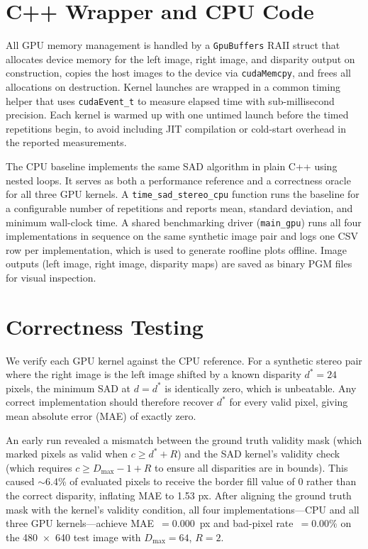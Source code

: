 \documentclass[11pt]{article}
\begin{document}
\section{C++ Wrapper and CPU Code}

All GPU memory management is handled by a \texttt{GpuBuffers} RAII struct that allocates
device memory for the left image, right image, and disparity output on construction, copies the
host images to the device via \texttt{cudaMemcpy}, and frees all allocations on destruction.
Kernel launches are wrapped in a common timing helper that uses \texttt{cudaEvent\_t} to measure
elapsed time with sub-millisecond precision. Each kernel is warmed up with one untimed launch
before the timed repetitions begin, to avoid including JIT compilation or cold-start overhead
in the reported measurements.

The CPU baseline implements the same SAD algorithm in plain C++ using nested loops. It serves
as both a performance reference and a correctness oracle for all three GPU kernels. A
\texttt{time\_sad\_stereo\_cpu} function runs the baseline for a configurable number of repetitions
and reports mean, standard deviation, and minimum wall-clock time. A shared benchmarking driver
(\texttt{main\_gpu}) runs all four implementations in sequence on the same synthetic image pair
and logs one CSV row per implementation, which is used to generate roofline plots offline.
Image outputs (left image, right image, disparity maps) are saved as binary PGM files for
visual inspection.

\section{Correctness Testing}

We verify each GPU kernel against the CPU reference. For a synthetic stereo pair where the right
image is the left image shifted by a known disparity $d^* = 24$ pixels, the minimum SAD at
$d = d^*$ is identically zero, which is unbeatable. Any correct implementation should therefore
recover $d^*$ for every valid pixel, giving mean absolute error (MAE) of exactly zero.

An early run revealed a mismatch between the ground truth validity mask (which marked pixels
as valid when $c \geq d^* + R$) and the SAD kernel's validity check (which requires $c \geq D_{\max}
- 1 + R$ to ensure all disparities are in bounds). This caused $\sim$6.4\% of evaluated pixels
to receive the border fill value of 0 rather than the correct disparity, inflating MAE to 1.53 px.
After aligning the ground truth mask with the kernel's validity condition, all four implementations---CPU
and all three GPU kernels---achieve MAE~$= 0.000$~px and bad-pixel rate~$= 0.00\%$ on the
480~$\times$~640 test image with $D_{\max} = 64$, $R = 2$.
\end{document}
